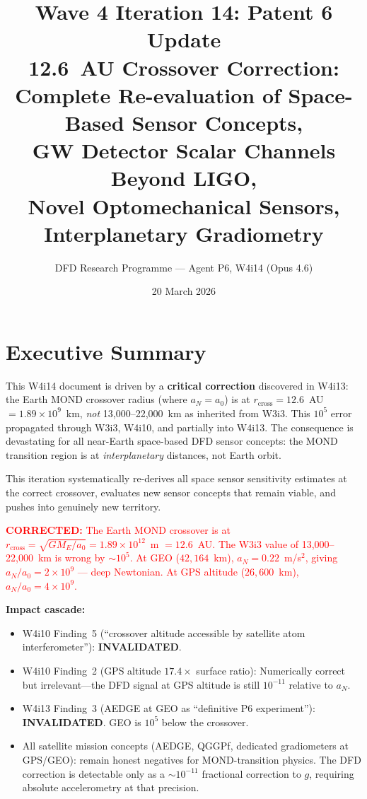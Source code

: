 \documentclass[11pt]{article}
\title{\textbf{Wave 4 Iteration 14: Patent 6 Update}\\[6pt]
12.6~AU Crossover Correction:\\
Complete Re-evaluation of Space-Based Sensor Concepts,\\
GW Detector Scalar Channels Beyond LIGO,\\
Novel Optomechanical Sensors, Interplanetary Gradiometry}
\author{DFD Research Programme --- Agent P6, W4i14 (Opus 4.6)}
\date{20 March 2026}
\theoremstyle{definition}
\theoremstyle{remark}
\newcommand{\ee}[1]{\times10^{#1}}
\newcommand{\azero}{a_0}
\newcommand{\corrected}[1]{\textcolor{red}{\textbf{CORRECTED:} #1}}
\begin{document}
\maketitle
\tableofcontents
\newpage

\section*{Executive Summary}

This W4i14 document is driven by a \textbf{critical correction} discovered in
W4i13: the Earth MOND crossover radius (where $a_N = \azero$) is at
$r_{\mathrm{cross}} = 12.6$~AU $= 1.89\ee{9}$~km, \emph{not}
13,000--22,000~km as inherited from W3i3. This $10^5$ error propagated
through W3i3, W4i10, and partially into W4i13. The consequence is
devastating for all near-Earth space-based DFD sensor concepts: the MOND
transition region is at \emph{interplanetary} distances, not Earth orbit.

This iteration systematically re-derives all space sensor sensitivity
estimates at the correct crossover, evaluates new sensor concepts that
remain viable, and pushes into genuinely new territory.

\begin{tcolorbox}[colback=red!5!white, colframe=red!60!black,
  title=\textbf{CRITICAL CORRECTION --- 12.6 AU Crossover}]
\corrected{The Earth MOND crossover is at $r_{\mathrm{cross}} =
\sqrt{GM_E/\azero} = 1.89\ee{12}$~m $= 12.6$~AU.
The W3i3 value of 13,000--22,000~km is wrong by $\sim 10^5$.
At GEO ($42{,}164$~km), $a_N = 0.22$~m/s$^2$, giving
$a_N/\azero = 2\ee{9}$ --- deep Newtonian. At GPS altitude
($26{,}600$~km), $a_N/\azero = 4\ee{9}$.}

\textbf{Impact cascade:}
\begin{itemize}[nosep]
\item W4i10 Finding~5 (``crossover altitude accessible by satellite
  atom interferometer''): \textbf{INVALIDATED}.
\item W4i10 Finding~2 (GPS altitude $17.4\times$ surface ratio):
  Numerically correct but irrelevant---the DFD signal at GPS
  altitude is still $10^{-11}$ relative to $a_N$.
\item W4i13 Finding~3 (AEDGE at GEO as ``definitive P6 experiment''):
  \textbf{INVALIDATED}. GEO is $10^5$ below the crossover.
\item All satellite mission concepts (AEDGE, QGGPf, dedicated
  gradiometers at GPS/GEO): remain honest negatives for
  MOND-transition physics. The DFD correction is detectable
  only as a $\sim 10^{-11}$ fractional correction to $g$,
  requiring absolute accelerometry at that precision.
\end{itemize}
\end{tcolorbox}
\end{document}
